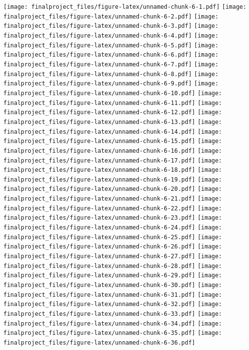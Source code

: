 \documentclass[
]{article}
\begin{document}
\texttt{[image: finalproject\_files/figure-latex/unnamed-chunk-6-1.pdf]}
\texttt{[image: finalproject\_files/figure-latex/unnamed-chunk-6-2.pdf]}
\texttt{[image: finalproject\_files/figure-latex/unnamed-chunk-6-3.pdf]}
\texttt{[image: finalproject\_files/figure-latex/unnamed-chunk-6-4.pdf]}
\texttt{[image: finalproject\_files/figure-latex/unnamed-chunk-6-5.pdf]}
\texttt{[image: finalproject\_files/figure-latex/unnamed-chunk-6-6.pdf]}
\texttt{[image: finalproject\_files/figure-latex/unnamed-chunk-6-7.pdf]}
\texttt{[image: finalproject\_files/figure-latex/unnamed-chunk-6-8.pdf]}
\texttt{[image: finalproject\_files/figure-latex/unnamed-chunk-6-9.pdf]}
\texttt{[image: finalproject\_files/figure-latex/unnamed-chunk-6-10.pdf]}
\texttt{[image: finalproject\_files/figure-latex/unnamed-chunk-6-11.pdf]}
\texttt{[image: finalproject\_files/figure-latex/unnamed-chunk-6-12.pdf]}
\texttt{[image: finalproject\_files/figure-latex/unnamed-chunk-6-13.pdf]}
\texttt{[image: finalproject\_files/figure-latex/unnamed-chunk-6-14.pdf]}
\texttt{[image: finalproject\_files/figure-latex/unnamed-chunk-6-15.pdf]}
\texttt{[image: finalproject\_files/figure-latex/unnamed-chunk-6-16.pdf]}
\texttt{[image: finalproject\_files/figure-latex/unnamed-chunk-6-17.pdf]}
\texttt{[image: finalproject\_files/figure-latex/unnamed-chunk-6-18.pdf]}
\texttt{[image: finalproject\_files/figure-latex/unnamed-chunk-6-19.pdf]}
\texttt{[image: finalproject\_files/figure-latex/unnamed-chunk-6-20.pdf]}
\texttt{[image: finalproject\_files/figure-latex/unnamed-chunk-6-21.pdf]}
\texttt{[image: finalproject\_files/figure-latex/unnamed-chunk-6-22.pdf]}
\texttt{[image: finalproject\_files/figure-latex/unnamed-chunk-6-23.pdf]}
\texttt{[image: finalproject\_files/figure-latex/unnamed-chunk-6-24.pdf]}
\texttt{[image: finalproject\_files/figure-latex/unnamed-chunk-6-25.pdf]}
\texttt{[image: finalproject\_files/figure-latex/unnamed-chunk-6-26.pdf]}
\texttt{[image: finalproject\_files/figure-latex/unnamed-chunk-6-27.pdf]}
\texttt{[image: finalproject\_files/figure-latex/unnamed-chunk-6-28.pdf]}
\texttt{[image: finalproject\_files/figure-latex/unnamed-chunk-6-29.pdf]}
\texttt{[image: finalproject\_files/figure-latex/unnamed-chunk-6-30.pdf]}
\texttt{[image: finalproject\_files/figure-latex/unnamed-chunk-6-31.pdf]}
\texttt{[image: finalproject\_files/figure-latex/unnamed-chunk-6-32.pdf]}
\texttt{[image: finalproject\_files/figure-latex/unnamed-chunk-6-33.pdf]}
\texttt{[image: finalproject\_files/figure-latex/unnamed-chunk-6-34.pdf]}
\texttt{[image: finalproject\_files/figure-latex/unnamed-chunk-6-35.pdf]}
\texttt{[image: finalproject\_files/figure-latex/unnamed-chunk-6-36.pdf]}
\end{document}
